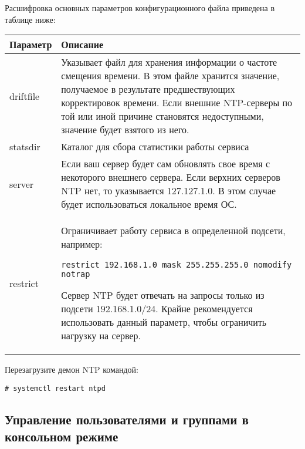 \documentclass[a4paper,10pt,twoside]{article}
\begin{document}
Расшифровка основных параметров конфигурационного файла приведена в таблице ниже:

\begin{longtable}{  m{5cm}  m{12cm}  }  
 \textbf{Параметр} & \textbf{Описание}\\\hline
 driftfile & Указывает файл для хранения информации о частоте смещения времени. В этом файле хранится значение, получаемое в результате предшествующих корректировок времени. Если внешние NTP-серверы по той или иной причине становятся недоступными, значение будет взятого из него.\\
 statsdir & Каталог для сбора статистики работы сервиса\\
 server & Если ваш сервер будет сам обновлять свое время с некоторого внешнего сервера. Если верхних серверов NTP нет, то указывается 127.127.1.0. В этом случае будет использоваться локальное время ОС.\\
 restrict & Ограничивает работу сервиса в определенной подсети, например:\begin{verbatim}restrict 192.168.1.0 mask 255.255.255.0 nomodify notrap                                                                                                                           \end{verbatim} 
Сервер NTP будет отвечать на запросы только из подсети  192.168.1.0/24.
Крайне рекомендуется использовать данный параметр, чтобы ограничить нагрузку на сервер.\\
\end{longtable}

Перезагрузите демон NTP командой:

\begin{verbatim}
# systemctl restart ntpd
\end{verbatim} 

\subsection{Управление пользователями и группами в консольном режиме}
\end{document}
